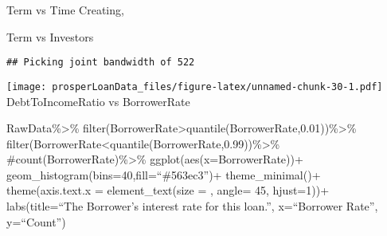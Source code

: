 \documentclass[]{article}
\newenvironment{Shaded}{\begin{snugshade}}{\end{snugshade}}
\newcommand{\DataTypeTok}[1]{\textcolor[rgb]{0.13,0.29,0.53}{#1}}
\newcommand{\DecValTok}[1]{\textcolor[rgb]{0.00,0.00,0.81}{#1}}
\newcommand{\FloatTok}[1]{\textcolor[rgb]{0.00,0.00,0.81}{#1}}
\newcommand{\KeywordTok}[1]{\textcolor[rgb]{0.13,0.29,0.53}{\textbf{#1}}}
\newcommand{\NormalTok}[1]{#1}
\newcommand{\OperatorTok}[1]{\textcolor[rgb]{0.81,0.36,0.00}{\textbf{#1}}}
\newcommand{\OtherTok}[1]{\textcolor[rgb]{0.56,0.35,0.01}{#1}}
\newcommand{\StringTok}[1]{\textcolor[rgb]{0.31,0.60,0.02}{#1}}
\begin{document}
Term vs Time Creating,

Term vs Investors

\begin{Shaded}
\end{Shaded}

\begin{verbatim}
## Picking joint bandwidth of 522
\end{verbatim}

\texttt{[image: prosperLoanData\_files/figure-latex/unnamed-chunk-30-1.pdf]}
DebtToIncomeRatio vs BorrowerRate

RawData\%\textgreater{}\%
filter(BorrowerRate\textgreater{}quantile(BorrowerRate,0.01))\%\textgreater{}\%
filter(BorrowerRate\textless{}quantile(BorrowerRate,0.99))\%\textgreater{}\%
\#count(BorrowerRate)\%\textgreater{}\% ggplot(aes(x=BorrowerRate))+
geom\_histogram(bins=40,fill=``\#563ec3'')+ theme\_minimal()+
theme(axis.text.x = element\_text(size = , angle= 45, hjust=1))+
labs(title=``The Borrower's interest rate for this loan.'', x=``Borrower
Rate'', y=``Count'')
\end{document}
